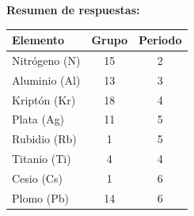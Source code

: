 \begin{exercise}
\begin{solu}
        \textbf{Resumen de respuestas:}
        \begin{center}
            \begin{tabular}{@{}lcc@{}}
                \toprule
                \textbf{Elemento} & \textbf{Grupo} & \textbf{Periodo} \\
                \midrule
                Nitrógeno (N) & 15 & 2 \\[3pt]
                Aluminio (Al) & 13 & 3 \\[3pt]
                Kriptón (Kr) & 18 & 4 \\[3pt]
                Plata (Ag) & 11 & 5 \\[3pt]
                Rubidio (Rb) & 1 & 5 \\[3pt]
                Titanio (Ti) & 4 & 4 \\[3pt]
                Cesio (Cs) & 1 & 6 \\[3pt]
                Plomo (Pb) & 14 & 6 \\
                \bottomrule
            \end{tabular}
        \end{center}
    \end{solu}
\end{exercise}
